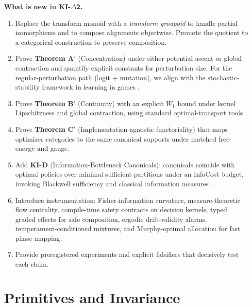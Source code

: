 \documentclass[11pt]{article}
\newcommand{\1}{\mathbbm{1}}
\newcommand{\Wone}{W_1}
\begin{document}
\textbf{What is new in KI-$\Delta$2.}
\begin{enumerate}[leftmargin=2em]
    \item Replace the transform monoid with a \emph{transform groupoid} to handle partial isomorphisms and to compose alignments objectwise. Promote the quotient to a categorical construction to preserve composition. 
    \item Prove \textbf{Theorem A$'$} (Concentration) under either potential ascent or global contraction and quantify explicit constants for perturbation size. For the regular-perturbation path (logit + mutation), we align with the stochastic-stability framework in learning in games \parencite{Young1993,Kandori1993}. 
    \item Prove \textbf{Theorem B$'$} (Continuity) with an explicit $\Wone$ bound under kernel Lipschitzness and global contraction, using standard optimal-transport tools \parencite{Villani2009}. 
    \item Prove \textbf{Theorem C$'$} (Implementation-agnostic functoriality) that maps optimizer categories to the same canonical supports under matched free-energy and gauge. 
    \item Add \textbf{KI-D} (Information-Bottleneck Canonicals): canonicals coincide with optimal policies over minimal sufficient partitions under an InfoCost budget, invoking Blackwell sufficiency \parencite{Blackwell1953} and classical information measures \parencite{CoverThomas2006}. 
    \item Introduce instrumentation: Fisher-information curvature, measure-theoretic flow centrality, compile-time safety contracts on decision kernels, typed graded effects for safe composition, ergodic drift-validity alarms, temperament-conditioned mixtures, and Murphy-optimal allocation for fast phase mapping. 
    \item Provide preregistered experiments and explicit falsifiers that decisively test each claim.
\end{enumerate}

\section{Primitives and Invariance}
\end{document}
